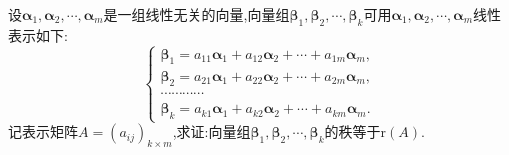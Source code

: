 \documentclass[../../main.tex]{subfiles}
\begin{document}
\begin{proposition}\label{proposition:线性无关向量组的命题6}
设\(\boldsymbol{\alpha}_1,\boldsymbol{\alpha}_2,\cdots,\boldsymbol{\alpha}_m\)是一组线性无关的向量,向量组\(\boldsymbol{\beta}_1,\boldsymbol{\beta}_2,\cdots,\boldsymbol{\beta}_k\)可用\(\boldsymbol{\alpha}_1,\boldsymbol{\alpha}_2,\cdots,\boldsymbol{\alpha}_m\)线性表示如下:
\[
\begin{cases}
\boldsymbol{\beta}_1 = a_{11}\boldsymbol{\alpha}_1 + a_{12}\boldsymbol{\alpha}_2+\cdots + a_{1m}\boldsymbol{\alpha}_m,\\
\boldsymbol{\beta}_2 = a_{21}\boldsymbol{\alpha}_1 + a_{22}\boldsymbol{\alpha}_2+\cdots + a_{2m}\boldsymbol{\alpha}_m,\\
\cdots\cdots\cdots\cdots\\
\boldsymbol{\beta}_k = a_{k1}\boldsymbol{\alpha}_1 + a_{k2}\boldsymbol{\alpha}_2+\cdots + a_{km}\boldsymbol{\alpha}_m.
\end{cases}
\]
记表示矩阵\(A=(a_{ij})_{k\times m}\),求证:向量组\(\boldsymbol{\beta}_1,\boldsymbol{\beta}_2,\cdots,\boldsymbol{\beta}_k\)的秩等于\(\text{r}(A)\).
\end{proposition}
\end{document}
